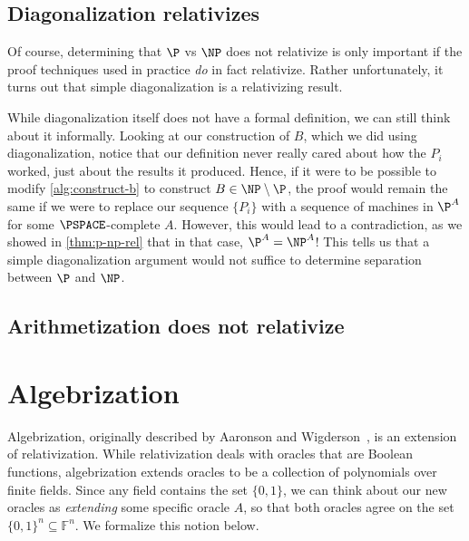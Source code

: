 \documentclass[english]{reedthesis}
\theoremstyle{plain}
\theoremstyle{definition}
\theoremstyle{remark}
\begin{document}
\section{Diagonalization relativizes}\label{sec:diag-relativizes}

Of course, determining that $\P$ vs $\NP$ does not relativize is only important
if the proof techniques used in practice \emph{do} in fact relativize. Rather
unfortunately, it turns out that simple diagonalization is a relativizing
result.

While diagonalization itself does not have a formal definition, we can still
think about it informally. Looking at our construction of $B$, which we did
using diagonalization, notice that our definition never really cared about how
the $P_{i}$ worked, just about the results it produced. Hence, if it were to be
possible to modify \cref{alg:construct-b} to construct $B \in \NP \setminus \P$, the proof
would remain the same if we were to replace our sequence $\{P_{i}\}$ with a
sequence of machines in $\P^{A}$ for some $\PSPACE$-complete $A$. However, this
would lead to a contradiction, as we showed in \cref{thm:p-np-rel} that in that
case, $\P^{A} = \NP^{A}$! This tells us that a simple diagonalization argument
would not suffice to determine separation between $\P$ and $\NP$.

\section{Arithmetization does not relativize}\label{sec:arith-non-rel}


\chapter{Algebrization}\label{chap:algebrization}

Algebrization, originally described by Aaronson and Wigderson~\cite{AW09}, is an
extension of relativization. While relativization deals with oracles that are
Boolean functions, algebrization extends oracles to be a collection of
polynomials over finite fields. Since any field contains the set $\{0, 1\}$, we
can think about our new oracles as \emph{extending} some specific oracle $A$, so
that both oracles agree on the set $\{0, 1\}^{n} \subseteq \mathbb{F}^{n}$. We formalize
this notion below.
\end{document}
